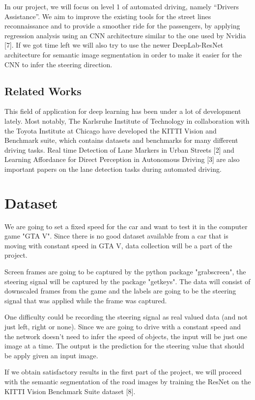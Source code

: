 \documentclass[10pt,twocolumn,letterpaper]{article}
\begin{document}
	In our project, we will focus on level 1 of automated driving, namely “Drivers Assistance”. We aim to improve the existing tools for the street lines reconnaissance and to provide a smoother ride for the passengers, by applying regression analysis using an CNN architecture similar to the one used by Nvidia [7].  If we got time left we will also try to use the newer DeepLab-ResNet architecture for semantic image segmentation in order to make it easier for the CNN to infer the steering direction. 
	
	\subsection{Related Works}
	
	This field of application for deep learning has been under a lot of development lately. Most notably, The Karlsruhe Institute of Technology in collaboration with the Toyota Institute at Chicago have developed the KITTI Vision and Benchmark suite, which contains datasets and benchmarks for many different driving tasks. Real time Detection of Lane Markers in Urban Streets [2] and Learning Affordance for Direct Perception in Autonomous Driving [3] are also important papers on the lane detection tasks during automated driving.
	
	\section{Dataset}
	We are going to set a fixed speed for the car and want to test it in the computer game "GTA V". Since there is no good dataset available from a car that is moving with constant speed in GTA V, data collection will be a part of the project.  
	
	Screen frames are going to be captured by the python package "grabscreen", the steering signal will be captured by the package "getkeys". The data will consist of downscaled frames from the game and the labels are going to be the steering signal that was applied while the frame was captured.
	
	One difficulty could be recording the steering signal as real valued data (and not just left, right or none). Since we are going to drive with a constant speed and the network doesn't need to infer the speed of objects, the input will be just one image at a time. The output is the prediction for the steering value that should be apply given an input image.
	
	If we obtain satisfactory results in the first part of the project, we will proceed with the semantic segmentation of the road images by training the ResNet on the KITTI Vision Benchmark Suite dataset [8].
	
\end{document}

